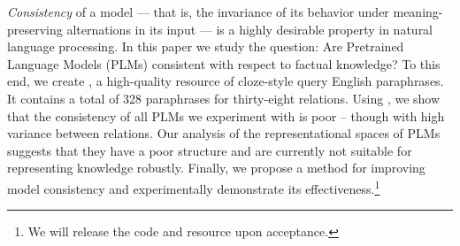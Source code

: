 
\textit{Consistency} of a model --- that is, the invariance
of its behavior under meaning-preserving alternations in its
input --- is a highly desirable property in natural language
processing.  In this paper we study the question: Are
Pretrained Language Models (PLMs) consistent with respect to
factual knowledge?
To this end, we create \resource{}, a
high-quality resource of cloze-style query English
paraphrases. It contains a total of 328 paraphrases for thirty-eight relations. Using \resource{}, we show that the consistency
of all PLMs we experiment with is poor -- though with high
variance between relations.  Our analysis of the
representational spaces of PLMs suggests that they have a
poor structure and are currently not suitable for
representing knowledge robustly. Finally, we propose
a method for improving model consistency and experimentally
demonstrate its effectiveness.\footnote{We will release the code and resource upon acceptance.}
